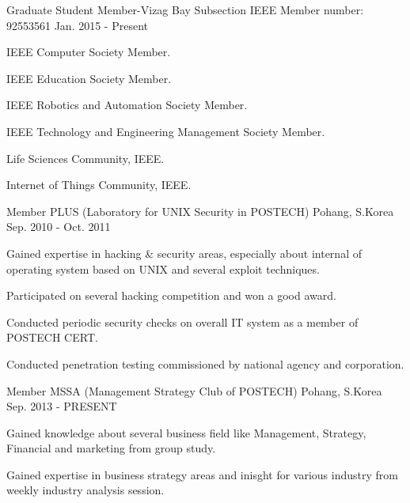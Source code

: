 \begin{cventries}
  \cventry
    {Graduate Student Member-Vizag Bay Subsection}
    {IEEE}
    {Member number: 92553561}
    {Jan. 2015 - Present}
    {
      \begin{cvitems}
        \item {IEEE Computer Society Member.}
        \item {IEEE Education Society Member.}
        \item {IEEE Robotics and Automation Society Member.}
        \item {IEEE Technology and Engineering Management Society Member.}
        \item {Life Sciences Community, IEEE.}
        \item {Internet of Things Community, IEEE.}
      \end{cvitems}
    }
  \cventry
    {Member}
    {PLUS (Laboratory for UNIX Security in POSTECH)}
    {Pohang, S.Korea}
    {Sep. 2010 - Oct. 2011}
    {
      \begin{cvitems}
        \item {Gained expertise in hacking \& security areas, especially about internal of operating system based on UNIX and several exploit techniques.}
        \item {Participated on several hacking competition and won a good award.}
        \item {Conducted periodic security checks on overall IT system as a member of POSTECH CERT.}
        \item {Conducted penetration testing commissioned by national agency and corporation.}
      \end{cvitems}
    }
  \cventry
    {Member}
    {MSSA (Management Strategy Club of POSTECH)}
    {Pohang, S.Korea}
    {Sep. 2013 - PRESENT}
    {
      \begin{cvitems}
        \item {Gained knowledge about several business field like Management, Strategy, Financial and marketing from group study.}
        \item {Gained expertise in business strategy areas and inisght for various industry from weekly industry analysis session.}
      \end{cvitems}
    }
\end{cventries}
